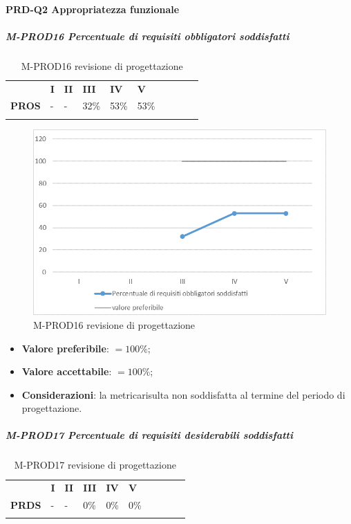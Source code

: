 \paragraph*{PRD-Q2 Appropriatezza funzionale}
\subparagraph{M-PROD16 Percentuale di requisiti obbligatori soddisfatti} \mbox{}
\begin{longtable}[H!] {						
		>{}p{50mm}  		
		>{}p{8mm}
		>{}p{8mm}		
		>{}p{8mm}		
		>{}p{8mm}		
		>{}p{8mm}		
		>{}p{8mm}
		>{}p{8mm}
		>{}p{8mm}
		>{}p{8mm}
	}
	\rowcolor{gray!50}
	\textbf{} & \textbf{I} & \textbf{II} & \textbf{III} & \textbf{IV} & \textbf{V} \TBstrut \\ [2mm]
	\textbf{PROS} & - & - & 32\% & 53\% & 53\% \TBstrut \\ [2mm]
	\rowcolor{white}
	\caption{M-PROD16 revisione di progettazione\glo}
\end{longtable}
\begin{figure}[H] 	
\includegraphics[width=\linewidth]{./img/grafici/RP13.png}	
\caption{M-PROD16 revisione di progettazione\glo}	
\end{figure}
\begin{itemize}
	\item \textbf{Valore preferibile}: $=100\%$;
	\item \textbf{Valore accettabile}: $=100\%$;
	\item \textbf{Considerazioni}: la metrica\glosp risulta non soddisfatta al termine del periodo di progettazione\glo.
\end{itemize}
\subparagraph{M-PROD17 Percentuale di requisiti desiderabili soddisfatti} \mbox{}
\begin{longtable}[H!] {						
		>{}p{50mm}  		
		>{}p{8mm}
		>{}p{8mm}		
		>{}p{8mm}		
		>{}p{8mm}		
		>{}p{8mm}		
		>{}p{8mm}
		>{}p{8mm}
		>{}p{8mm}
		>{}p{8mm}
	}
	\rowcolor{gray!50}
	\textbf{} & \textbf{I} & \textbf{II} & \textbf{III} & \textbf{IV} & \textbf{V} \TBstrut \\ [2mm]
	\textbf{PRDS} & - & - & 0\% & 0\% & 0\% \TBstrut \\ [2mm]
	\rowcolor{white}
	\caption{M-PROD17 revisione di progettazione\glo}
\end{longtable}
